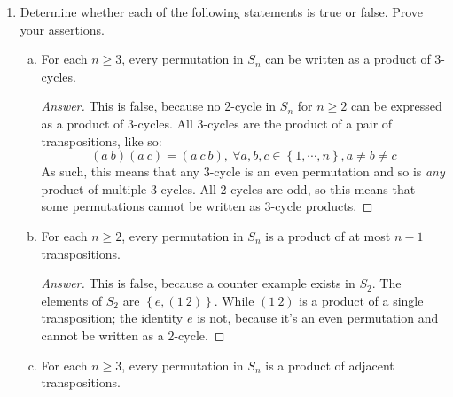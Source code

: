 \documentclass{article}
\newcommand{\bracks}[1]{\left\{#1\right\}}
\begin{document}
\begin{enumerate}[(H1)]
\begin{proof}
\end{proof}


\item 
Determine whether each of the following statements is true or false.  
Prove your assertions.  

\begin{enumerate}[(a)]
\item 
For each $n \ge 3$, every permutation in $S_n$ can be written as a 
product of 3-cycles.  

\begin{proof}[Answer]
This is false, because no 2-cycle in $S_n$ for $n \geq 2$ can be 
expressed as a product of 3-cycles. All 3-cycles are the product of a
pair of transpositions, like so:
$$(a\ b)(a\ c) = (a\ c\ b),\ \forall a,b,c \in \bracks{1,\cdots, n}, 
a \neq b \neq c$$ 
As such, this means that any 3-cycle is an even permutation and 
so is \emph{any} product of multiple 3-cycles. All 2-cycles are odd, 
so this means that some permutations cannot be written as 3-cycle 
products.
\end{proof}


\item 
For each $n \ge 2$, every permutation in $S_n$ is a product of at 
most $n-1$ transpositions.  

\begin{proof}[Answer]
This is false, because a counter example exists in $S_2$. 
The elements of $S_2$ are $\bracks{e, (1\ 2)}$. While $(1\ 2)$ is a 
product of a single transposition; the identity $e$ is not, because 
it's an even permutation and cannot be written as a 2-cycle.
\end{proof}


\item 
For each $n \ge 3$, every permutation in $S_n$ is a product of 
adjacent transpositions.  


\end{enumerate}
\end{enumerate}
\end{document}
